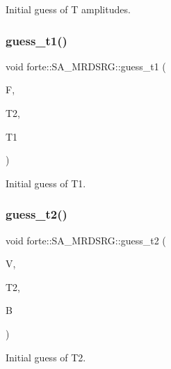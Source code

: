 Initial guess of T amplitudes. 

\mbox{\label{classforte_1_1_s_a___m_r_d_s_r_g_ae32281c336983e306e06cd66f9428d58}} 
\subsubsection{\texorpdfstring{guess\+\_\+t1()}{guess\_t1()}}
{\footnotesize\ttfamily void forte\+::\+S\+A\+\_\+\+M\+R\+D\+S\+R\+G\+::guess\+\_\+t1 (\begin{DoxyParamCaption}\item[{Blocked\+Tensor \&}]{F,  }\item[{Blocked\+Tensor \&}]{T2,  }\item[{Blocked\+Tensor \&}]{T1 }\end{DoxyParamCaption})\hspace{0.3cm}{\ttfamily [protected]}}



Initial guess of T1. 

\mbox{\label{classforte_1_1_s_a___m_r_d_s_r_g_aa06609443262686d26c68c367d8596eb}} 
\subsubsection{\texorpdfstring{guess\+\_\+t2()}{guess\_t2()}}
{\footnotesize\ttfamily void forte\+::\+S\+A\+\_\+\+M\+R\+D\+S\+R\+G\+::guess\+\_\+t2 (\begin{DoxyParamCaption}\item[{Blocked\+Tensor \&}]{V,  }\item[{Blocked\+Tensor \&}]{T2,  }\item[{Blocked\+Tensor \&}]{B }\end{DoxyParamCaption})\hspace{0.3cm}{\ttfamily [protected]}}



Initial guess of T2. 

